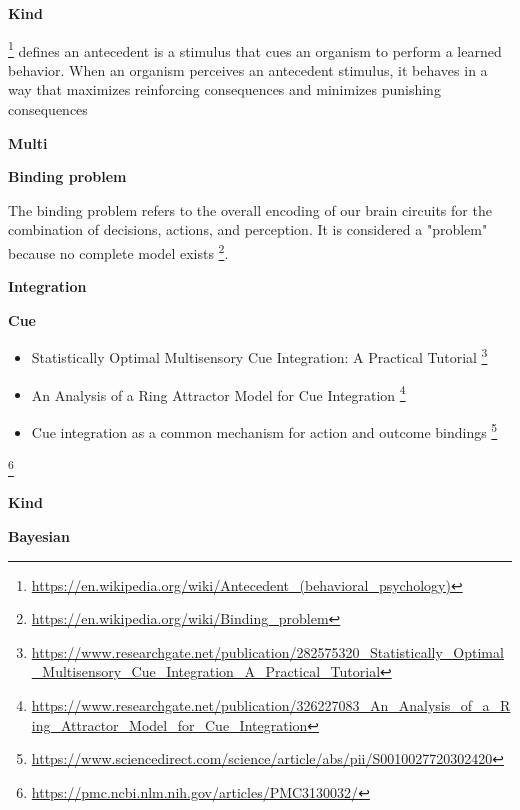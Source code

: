 \documentclass{book}
\providecommand{\ProjectDeepHeading}[2]{%
    \par\medskip\noindent\textbf{#2}\par\smallskip
}
\providecommand{\seeherefooter}[1]{\footnote{\url{#1}}}
\providecommand{\clickurlfooter}[1]{\footnote{\url{#1}}}
\begin{document}
\ProjectDeepHeading{5}{Kind}


\clickurlfooter{https://en.wikipedia.org/wiki/Antecedent_(behavioral_psychology)} defines an antecedent is a stimulus that cues an organism to perform a learned behavior. When an organism perceives an antecedent stimulus, it behaves in a way that maximizes reinforcing consequences and minimizes punishing consequences

\ProjectDeepHeading{2}{Multi}

\ProjectDeepHeading{3}{Binding problem}


The binding problem refers to the overall encoding of our brain circuits for the combination of decisions, actions, and perception. It is considered a "problem" because no complete model exists \seeherefooter{https://en.wikipedia.org/wiki/Binding_problem}.

\ProjectDeepHeading{3}{Integration}

\ProjectDeepHeading{4}{Cue}


\begin{itemize}
        \item Statistically Optimal Multisensory Cue Integration: A Practical Tutorial \seeherefooter{https://www.researchgate.net/publication/282575320_Statistically_Optimal_Multisensory_Cue_Integration_A_Practical_Tutorial}
        \item An Analysis of a Ring Attractor Model for Cue Integration \seeherefooter{https://www.researchgate.net/publication/326227083_An_Analysis_of_a_Ring_Attractor_Model_for_Cue_Integration}
        \item Cue integration as a common mechanism for action and outcome bindings \seeherefooter{https://www.sciencedirect.com/science/article/abs/pii/S0010027720302420}
    \end{itemize}
    \seeherefooter{https://pmc.ncbi.nlm.nih.gov/articles/PMC3130032/}

\ProjectDeepHeading{4}{Kind}

\ProjectDeepHeading{5}{Bayesian}

\end{document}
